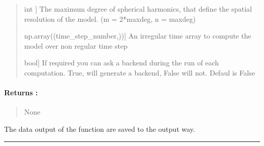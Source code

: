 \documentclass[letterpaper,10pt,english]{sphinxmanual}
\begin{document}
\begin{fulllineitems}
\begin{quote}
\begin{description}
\sphinxlineitem{maxdeg}{[}int {]}
\sphinxAtStartPar
The maximum degree of spherical harmonics, that define the spatial resolution of the model. (m = 2*maxdeg, n = maxdeg)

\sphinxlineitem{irregular\_time\_step}{[}np.array((time\_step\_number,)){]}
\sphinxAtStartPar
An irregular time array to compute the model over non regular time step

\sphinxlineitem{backend}{[}bool{]}
\sphinxAtStartPar
If required you can ask a backend during the run of each computation. True, will generate a backend, False will not. Defaul is False

\end{description}
\end{quote}


\paragraph{Returns :}
\label{\detokenize{SOLVER_doc:returns}}\begin{quote}

\sphinxAtStartPar
None
\end{quote}

\sphinxAtStartPar
The data output of the function are saved to the output way.

\end{fulllineitems}



\bigskip\hrule\bigskip

\end{document}
